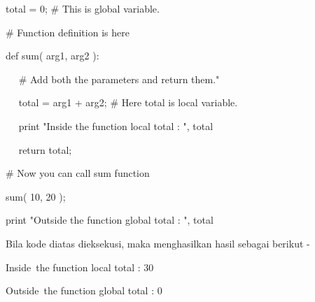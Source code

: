 \vspace{12pt}
\noindent 
 \hspace*{0.5in} total = 0;  $  \#  $ This is global variable. \par
\noindent 
 \hspace*{0.5in}  $  \#  $ Function definition is here \par
\noindent 
 \hspace*{0.5in} def sum( arg1, arg2 ): \par
\noindent 
 \hspace*{0.5in} ~~  $  \#  $ Add both the parameters and return them." \par
\noindent 
 \hspace*{0.5in} ~~ total = arg1 + arg2;  $  \#  $ Here total is local variable. \par
\noindent 
 \hspace*{0.5in} ~~ print "Inside the function local total : ", total \par
\noindent 
 \hspace*{0.5in} ~~ return total; \par
\noindent 
 \hspace*{0.5in} \vspace{12pt}
\noindent 
 \hspace*{0.5in}  $  \#  $ Now you can call sum function \par
\noindent 
 \hspace*{0.5in} sum( 10, 20 ); \par
\noindent 
 \hspace*{0.5in} print "Outside the function global total : ", total  \par
\noindent 
Bila kode diatas dieksekusi, maka menghasilkan hasil sebagai berikut - \par
\noindent 
 \hspace*{0.5in} Inside~the function local total :  30 \par
\noindent 
 \hspace*{0.5in} Outside~the function global total :  0 \par

